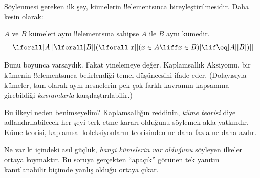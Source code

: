 


Söylenmesi gereken ilk şey, kümelerin !!{element}s{}ınca bireyleştirilmesidir.
Daha kesin olarak:

\begin{axiom}[Kaplamsallık]
$A$ ve $B$ kümeleri aynı !!{element}s{}ına sahipse $A$ ile $B$ aynı kümedir.
\[
  \lforall[A][\lforall[B][(\lforall[x][(x \in A \liff x \in B)] \lif
  \eq[A][B])]]
\]
\end{axiom}

Bunu  boyunca varsaydık. Fakat yinelemeye değer.
Kaplamsallık Aksiyomu, bir kümenin !!{element}s{}ınca belirlendiği temel
düşüncesini ifade eder. (Dolayısıyla kümeler, tam olarak aynı nesnelerin pek
çok farklı kavramın kapsamına girebildiği \emph{kavramlarla} karşılaştırılabilir.)

Bu ilkeyi neden benimseyelim? Kaplamsallığın reddinin, \emph{küme teorisi}
diye adlandırılabilecek her şeyi terk etme kararı olduğunu söylemek
akla yatkındır. Küme teorisi, kaplamsal koleksiyonların teorisinden ne daha
fazla ne daha azdır.

Ne var ki  içindeki asıl güçlük, \emph{hangi kümelerin
var olduğunu} söyleyen ilkeler ortaya koymaktır. Bu soruya gerçekten
``apaçık'' görünen tek yanıtın kanıtlanabilir biçimde yanlış olduğu ortaya
çıkar.

